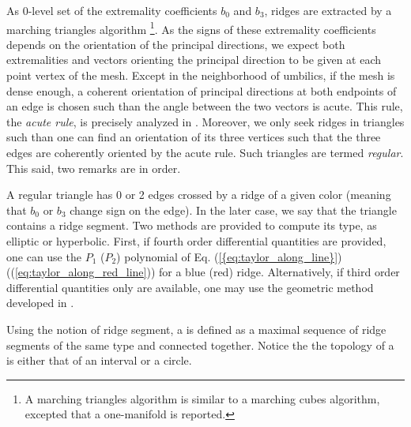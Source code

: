 As 0-level set of the extremality coefficients $b_0$ and $b_3$, ridges
are extracted by a marching triangles algorithm \footnote{A marching
triangles algorithm is similar to a marching cubes algorithm, excepted
that a one-manifold is reported.}.
As the signs of these extremality coefficients depends on the
orientation of the principal directions, we expect both extremalities
and vectors orienting the principal direction to be given at each
point vertex of the mesh. Except in the neighborhood of umbilics, if
the mesh is dense enough, a coherent orientation of principal
directions at both endpoints of an edge is chosen such than the angle
between the two vectors is acute. This rule, the {\em acute rule}, is
precisely analyzed in \cite{cgal:tr-cp-tdare-05}.
Moreover, we only seek ridges in triangles such than one can find an
orientation of its three vertices such that the three edges are
coherently oriented by the acute rule. Such triangles are termed
{\em regular}. This said, two remarks are in order.



A regular triangle has 0 or 2 edges crossed by a ridge of a given
color (meaning that $b_0$ or $b_3$ change sign on the edge). In the
later case, we say that the triangle contains a ridge segment.
Two methods are provided to compute its type, as elliptic or
hyperbolic. First, if fourth order differential quantities are
provided, one can use the $P_1$ ($P_2$) polynomial of Eq.
(\ref{{eq:taylor_along_line}}) ((\ref{eq:taylor_along_red_line})) for
a blue (red) ridge.
Alternatively, if third order differential quantities only are
available, one may use the geometric method developed in
\cite{cgal:cp-tdare-05}.


Using the notion of ridge segment, a  is defined as a
maximal sequence of ridge segments of the same type and connected
together.  Notice the the topology of a  is either
that of an interval or a circle.




